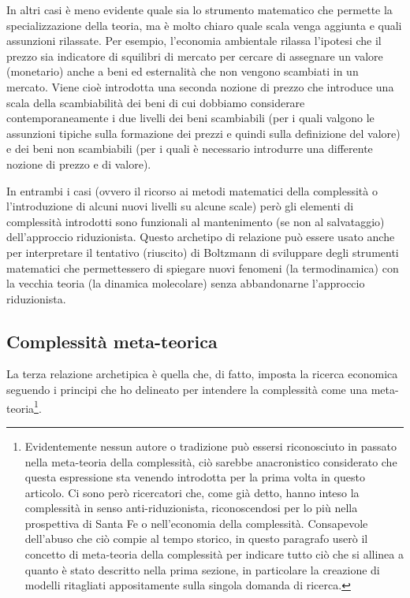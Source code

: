 \documentclass[a4paper, headings=standardclasses]{scrartcl}
\begin{document}
In altri casi è meno evidente quale sia lo strumento matematico che permette la specializzazione della teoria, ma è molto chiaro quale scala venga aggiunta e quali assunzioni rilassate. Per esempio, l'economia ambientale rilassa l'ipotesi che il prezzo sia indicatore di squilibri di mercato per cercare di assegnare un valore (monetario) anche a beni ed esternalità che non vengono scambiati in un mercato.
Viene cioè introdotta una seconda nozione di prezzo che introduce una scala della scambiabilità dei beni di cui dobbiamo considerare contemporaneamente i due livelli dei beni scambiabili (per i quali valgono le assunzioni tipiche sulla formazione dei prezzi e quindi sulla definizione del valore) e dei beni non scambiabili (per i quali è necessario introdurre una differente nozione di prezzo e di valore).

In entrambi i casi (ovvero il ricorso ai metodi matematici della complessità o l'introduzione di alcuni nuovi livelli su alcune scale) però gli elementi di complessità introdotti sono funzionali al mantenimento (se non al salvataggio) dell'approccio riduzionista.
Questo archetipo di relazione può essere usato anche per interpretare il tentativo (riuscito) di Boltzmann di sviluppare degli strumenti matematici che permettessero di spiegare nuovi fenomeni (la termodinamica) con la vecchia teoria (la dinamica molecolare) senza abbandonarne l'approccio riduzionista.

\subsection{Complessità meta-teorica}
La terza relazione archetipica è quella che, di fatto, imposta la ricerca economica seguendo i principi che ho delineato per intendere la complessità come una meta-teoria\footnote{Evidentemente nessun autore o tradizione può essersi riconosciuto in passato nella meta-teoria della complessità, ciò sarebbe anacronistico considerato che questa espressione sta venendo introdotta per la prima volta in questo articolo. Ci sono però ricercatori che, come già detto, hanno inteso la complessità in senso anti-riduzionista, riconoscendosi per lo più nella prospettiva di Santa Fe o nell'economia della complessità. Consapevole dell'abuso che ciò compie al tempo storico, in questo paragrafo userò il concetto di meta-teoria della complessità per indicare tutto ciò che si allinea a quanto è stato descritto nella prima sezione, in particolare la creazione di modelli ritagliati appositamente sulla singola domanda di ricerca.}.
\end{document}
